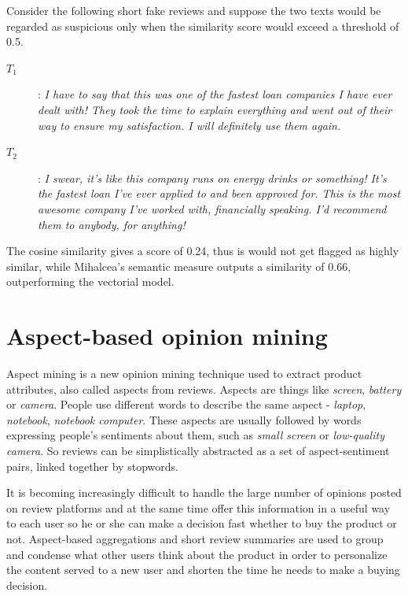 Consider the following short fake reviews and suppose the two texts would be regarded as suspicious only when the similarity score would exceed a threshold of 0.5. 

\begin{description}
\item[$T_1$]: \textit{I have to say that this was one of the fastest loan companies I have ever dealt with! They took the time to explain everything and went out of their way to ensure my satisfaction. I will definitely use them again.}
\item[$T_2$]: \textit{I swear, it's like this company runs on energy drinks or something! It's the fastest loan I've ever applied to and been approved for. This is the most awesome company I've worked with, financially speaking. I'd recommend them to anybody, for anything!}
\end{description}

The cosine similarity gives a score of 0.24, thus is would not get flagged as highly similar, while Mihalcea’s semantic measure outputs a similarity of 0.66, outperforming the vectorial model.

\clearpage

\section{Aspect-based opinion mining}\label{section:aspect-based-opinion-mining}

Aspect mining is a new opinion mining technique used to extract product attributes, also called aspects from reviews. Aspects are things like \textit{screen}, \textit{battery} or \textit{camera}. People use different words to describe the same aspect - \textit{laptop}, \textit{notebook}, \textit{notebook computer}. These aspects are usually followed by words expressing people's sentiments about them, such as \textit{small screen} or \textit{low-quality camera}. So reviews can be simplistically abstracted as a set of aspect-sentiment pairs, linked together by stopwords.

It is becoming increasingly difficult to handle the large number of opinions posted on review platforms and at the same time offer this information in a useful way to each user so he or she can make a decision fast whether to buy the product or not. Aspect-based aggregations and short review summaries are used to group and condense what other users think about the product in order to personalize the content served to a new user and shorten the time he needs to make a buying decision.


